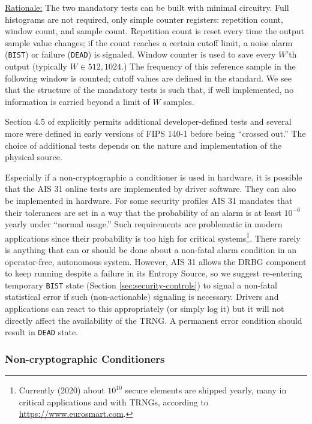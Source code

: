     \underline{Rationale:}
    The two mandatory tests can be built with minimal circuitry.
    Full histograms are not required, only simple counter registers:
    repetition count, window count, and sample count.
    Repetition count is reset every time the output sample value
    changes; if the count reaches a certain cutoff limit, a noise alarm
    (\verb|BIST|) or failure (\verb|DEAD|) is signaled. Window counter is
    used to save every $W$'th output (typically $W \in { 512, 1024 }$.)
    The frequency of this reference sample in the following window is
    counted; cutoff values are defined in the standard. We see that the
    structure of the mandatory tests is such that, if well implemented,
    no information is carried beyond a limit of $W$ samples.

    Section 4.5 of \cite{TuBaKe+18} explicitly permits additional
    developer-defined tests and several more were defined in early
    versions of FIPS 140-1 before being ``crossed out.'' The choice
    of additional tests depends on the nature and implementation of the
    physical source.

    Especially if a non-cryptographic a conditioner is used in hardware,
    it is possible that the AIS 31 \cite{KiSc11} online tests are
    implemented by driver software. They can also be implemented in hardware.
    For some security profiles AIS 31 mandates that their tolerances are
    set in a way that the probability of an alarm is at least $10^{-6}$
    yearly under ``normal usage.'' Such requirements are problematic
    in modern applications since their probability is too high for
    critical systems\footnote{Currently (2020) about $10^{10}$ secure
    elements are shipped yearly, many in critical applications and with
    TRNGs, according to \url{https://www.eurosmart.com}.}.
    There rarely is anything that can or should be done about a non-fatal
    alarm condition in an operator-free, autonomous system. However,
    AIS 31 allows the DRBG component to keep running despite a failure in
    its Entropy Source, so we suggest re-entering temporary \verb|BIST|
    state (Section \ref{sec:security-controls}) to signal a non-fatal
    statistical error if such (non-actionable) signaling is necessary.
    Drivers and applications can react to this appropriately (or simply
    log it) but it will not directly affect the availability of the TRNG.
    A permanent error condition should result in \verb|DEAD| state.

\subsubsection{Non-cryptographic Conditioners}
\label{sec:noncrypto}

